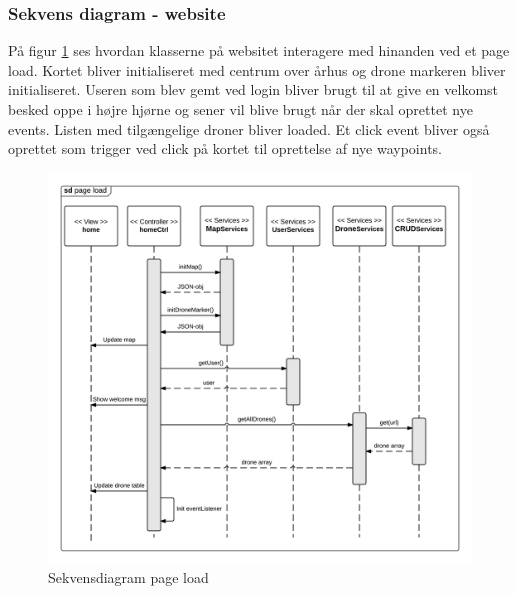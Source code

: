 \subsubsection*{Sekvens diagram - website}
\vspace{-0.1cm}
På figur \ref{fig:page_load} ses hvordan klasserne på websitet interagere med hinanden ved et page load. Kortet bliver initialiseret med centrum over århus og drone markeren bliver initialiseret. Useren som blev gemt ved login bliver brugt til at give en velkomst besked oppe i højre hjørne og sener vil blive brugt når der skal oprettet nye events. Listen med tilgængelige droner bliver loaded. Et click event bliver også oprettet som trigger ved click på kortet til oprettelse af nye waypoints.
\begin{figure}[H]
	\centering
	\includegraphics[width=1\textwidth]{Billeder/sekvens/sd_page_load.png}
	\caption{Sekvensdiagram page load}
	\label{fig:page_load}
\end{figure}

